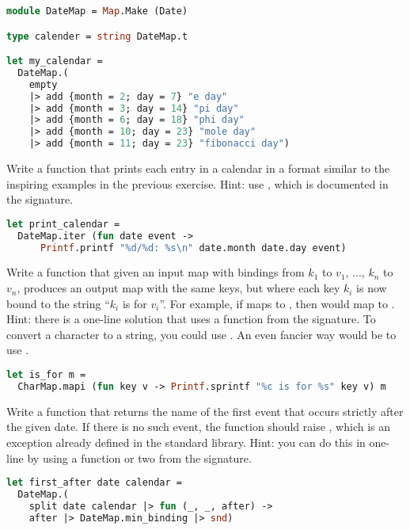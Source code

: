 \begin{lstlisting}[language=OCaml]
module DateMap = Map.Make (Date)

type calender = string DateMap.t

let my_calendar =
  DateMap.(
    empty
    |> add {month = 2; day = 7} "e day"
    |> add {month = 3; day = 14} "pi day"
    |> add {month = 6; day = 18} "phi day"
    |> add {month = 10; day = 23} "mole day"
    |> add {month = 11; day = 23} "fibonacci day")
\end{lstlisting}

Write a function  that prints each entry in a calendar in a format similar to the inspiring examples in the previous exercise. Hint: use , which is documented in the  signature.

\begin{lstlisting}[language=OCaml]
let print_calendar =
  DateMap.iter (fun date event ->
      Printf.printf "%d/%d: %s\n" date.month date.day event)
\end{lstlisting}

\problem[is for]
Write a function  that given an input map with bindings from $k_1$ to $v_1$, ..., $k_n$ to $v_n$, produces an output map with the same keys, but where each key $k_i$ is now bound to the string ``$k_i$ is for $v_i$''. For example, if  maps  to , then  would map  to . Hint: there is a one-line solution that uses a function from the  signature. To convert a character to a string, you could use . An even fancier way would be to use .

\begin{lstlisting}[language=OCaml]
let is_for m =
  CharMap.mapi (fun key v -> Printf.sprintf "%c is for %s" key v) m
\end{lstlisting}

Write a function  that returns the name of the first event that occurs strictly after the given date. If there is no such event, the function should raise , which is an exception already defined in the standard library. Hint: you can do this in one-line by using a function or two from the  signature.

\begin{lstlisting}[language=OCaml]
let first_after date calendar =
  DateMap.(
    split date calendar |> fun (_, _, after) ->
    after |> DateMap.min_binding |> snd)
\end{lstlisting}

